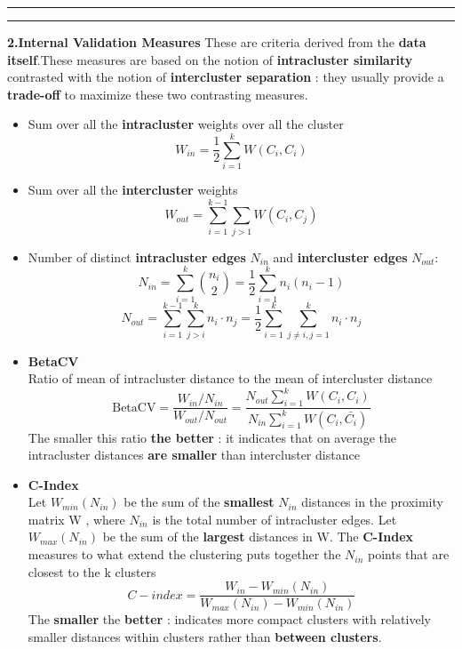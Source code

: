 \begin{description}
\begin{center}
\rule{1\textwidth}{.1pt}
\rule{1\textwidth}{.1pt}
\end{center}

\item \textbf{2.Internal Validation Measures}
These are criteria derived from the \textbf{data itself}.These measures are based on the notion of \textbf{intracluster similarity} contrasted with the notion of \textbf{intercluster separation} : they usually provide a \textbf{trade-off} to maximize these two contrasting measures.
\begin{itemize}
\item Sum over all the \textbf{intracluster} weights over all the cluster 
$$ W_{in} = \frac{1}{2} \sum \limits_{i=1}^{k} W(C_i ,C_i)$$
\item Sum over all the \textbf{intercluster} weights 
$$ W_{out} = \sum \limits_{i=1}^{k-1} \sum \limits_{j>1}W(C_i,C_j)$$
\item Number of distinct \textbf{intracluster edges} $N_{in}$
 and \textbf{intercluster edges } $N_{out}$:
 $$ N_{in} = \sum \limits_{i=1}^{k} \binom{n_i}{2} = \frac{1}{2}\sum \limits_{i=1}^{k} n_i(n_i-1)$$
 $$ N_{out}= \sum \limits_{i=1}^{k-1} \sum \limits_{j>i}^{k} n_i \cdot n_j = \frac{1}{2} \sum \limits_{i=1}^{k} \sum \limits_{j \neq i, j=1}^{k} n_i \cdot n_j$$
 
\item \textbf{BetaCV}\\
Ratio of mean of intracluster distance to the mean of intercluster distance
$$ \text{BetaCV} =  \frac{W_{in} / N_{in}}{W_{out} / N_{out}}=  \frac{N_{out} \sum \limits_{i=1}^{k} W(C_i,C_i)}{N_{in} \sum \limits_{i=1}^{k} W(C_i,\bar{C_i})}$$
 The smaller this ratio \textbf{the better} : it indicates that on average the intracluster distances \textbf{are smaller} than intercluster distance
 
 \item \textbf{C-Index}\\
 Let $W_{min}(N_{in})$ be the sum of the \textbf{smallest} $N_{in}$ distances in the proximity matrix W , where $N_{in}$ is the total number of intracluster edges. Let $W_{max}(N_{in})$ be the sum of the \textbf{largest} distances in W. The \textbf{C-Index} measures to what extend the clustering puts together the $N_{in}$ points that are closest to the k clusters 
 $$C-index = \frac{W_{in}-W_{min}(N_{in})}{W_{max}(N_{in})-W_{min}(N_{in})} $$
 The \textbf{smaller} the \textbf{better} : indicates more compact clusters with relatively smaller distances within clusters rather than \textbf{between clusters}.


\end{itemize}
\end{description}
